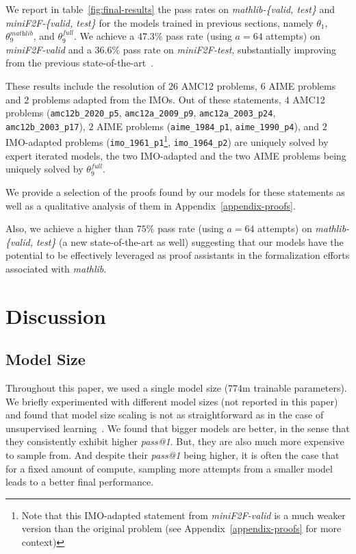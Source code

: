 \documentclass[nohyperref]{article}
\theoremstyle{plain}
\theoremstyle{definition}
\theoremstyle{remark}
\begin{document}
We report in table~\ref{fig:final-results} the pass rates on \textit{mathlib-\{valid, test\}} and \textit{miniF2F-\{valid, test\}} for the  models trained in previous sections, namely $\theta_1$, $\theta_9^{\textit{mathlib}}$, and $\theta_9^{\textit{full}}$. We achieve a $47.3\%$ pass rate (using $a=64$ attempts) on \textit{miniF2F-valid} and a $36.6\%$ pass rate on \textit{miniF2F-test}, substantially improving from the previous state-of-the-art~\cite{zheng2021minif2f}. 

These results include the resolution of $26$ AMC12 problems, $6$ AIME problems and $2$ problems adapted from the IMOs. Out of these statements, $4$ AMC12 problems (\verb|amc12b_2020_p5|, \verb|amc12a_2009_p9|, \verb|amc12a_2003_p24|, \verb|amc12b_2003_p17|), $2$ AIME problems (\verb|aime_1984_p1|, \verb|aime_1990_p4|), and $2$ IMO-adapted problems (\verb|imo_1961_p1|\footnote{Note that this IMO-adapted statement from \textit{miniF2F-valid} is a much weaker version than the original problem (see Appendix~\ref{appendix-proofs} for more context)}, \verb|imo_1964_p2|) are uniquely solved by expert iterated models, the two IMO-adapted and the two AIME problems being uniquely solved by $\theta_9^{\textit{full}}$. 

We provide a selection of the proofs found by our models for these statements as well as a qualitative analysis of them in Appendix~\ref{appendix-proofs}.

Also, we achieve a higher than $75\%$ pass rate (using $a=64$ attempts) on \textit{mathlib-\{valid, test\}} (a new state-of-the-art as well) suggesting that our models have the potential to be effectively leveraged as proof assistants in the formalization efforts associated with \textit{mathlib}.


\section{Discussion}

\subsection{Model Size}

Throughout this paper, we used a single model size (774m trainable parameters). We briefly experimented with different model sizes (not reported in this paper) and found that model size scaling is not as straightforward as in the case of unsupervised learning~\cite{kaplan2020scaling}. We found that bigger models are better, in the sense that they consistently exhibit higher \textit{pass@1}. But, they are also much more expensive to sample from. And despite their \textit{pass@1} being higher, it is often the case that for a fixed amount of compute, sampling more attempts from a smaller model leads to a better final performance.
\end{document}
